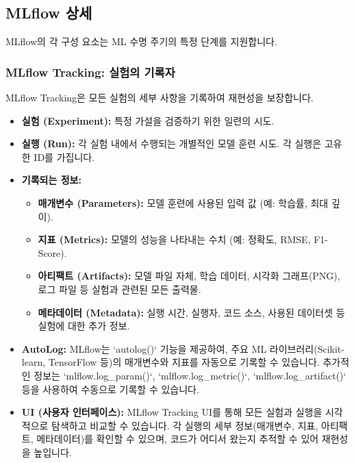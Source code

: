 \documentclass[11pt,a4paper]{article}
\begin{document}
\subsection*{MLflow 상세}
MLflow의 각 구성 요소는 ML 수명 주기의 특정 단계를 지원합니다.

\subsubsection*{MLflow Tracking: 실험의 기록자}
MLflow Tracking은 모든 실험의 세부 사항을 기록하여 재현성을 보장합니다.
\begin{itemize}
    \item \textbf{실험 (Experiment):} 특정 가설을 검증하기 위한 일련의 시도.
    \item \textbf{실행 (Run):} 각 실험 내에서 수행되는 개별적인 모델 훈련 시도. 각 실행은 고유한 ID를 가집니다.
    \item \textbf{기록되는 정보:}
    \begin{itemize}
        \item \textbf{매개변수 (Parameters):} 모델 훈련에 사용된 입력 값 (예: 학습률, 최대 깊이).
        \item \textbf{지표 (Metrics):} 모델의 성능을 나타내는 수치 (예: 정확도, RMSE, F1-Score).
        \item \textbf{아티팩트 (Artifacts):} 모델 파일 자체, 학습 데이터, 시각화 그래프(PNG), 로그 파일 등 실험과 관련된 모든 출력물.
        \item \textbf{메타데이터 (Metadata):} 실행 시간, 실행자, 코드 소스, 사용된 데이터셋 등 실험에 대한 추가 정보.
    \end{itemize}
    \item \textbf{AutoLog:} MLflow는 `autolog()` 기능을 제공하여, 주요 ML 라이브러리(Scikit-learn, TensorFlow 등)의 매개변수와 지표를 자동으로 기록할 수 있습니다. 추가적인 정보는 `mlflow.log_param()`, `mlflow.log_metric()`, `mlflow.log_artifact()` 등을 사용하여 수동으로 기록할 수 있습니다.
    \item \textbf{UI (사용자 인터페이스):} MLflow Tracking UI를 통해 모든 실험과 실행을 시각적으로 탐색하고 비교할 수 있습니다. 각 실행의 세부 정보(매개변수, 지표, 아티팩트, 메타데이터)를 확인할 수 있으며, 코드가 어디서 왔는지 추적할 수 있어 재현성을 높입니다.
\end{itemize}
\end{document}
